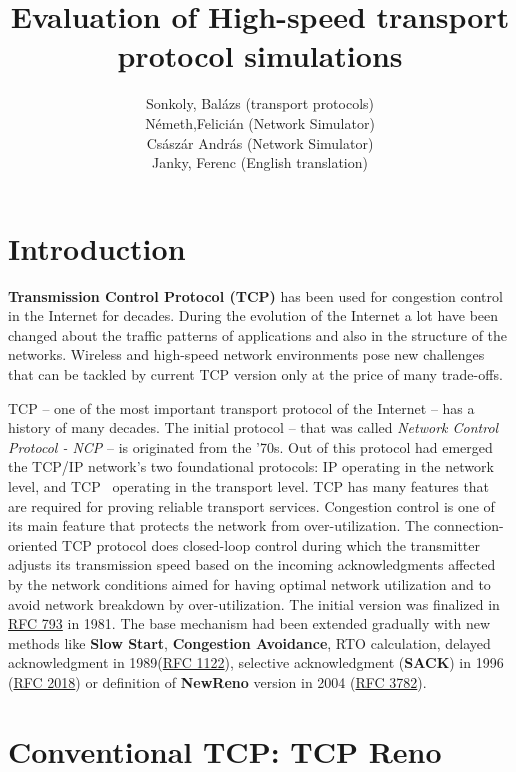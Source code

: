 \documentclass[a4paper]{article}
\title{Evaluation of High-speed transport protocol simulations}
\author{Sonkoly, Balázs (transport protocols) \\ Németh,Felicián (Network Simulator) \\Császár András (Network Simulator) \\ Janky, Ferenc (English translation)
}
\date{}
\begin{document}
\maketitle

\tableofcontents

\section{Introduction}

\textbf{Transmission Control Protocol (TCP)} has been used for congestion control in the Internet for decades. During
the evolution of the Internet a lot have been changed about the traffic patterns of applications and also in the
structure of the networks. Wireless and high-speed network environments pose new challenges that can be tackled by
current TCP version only at the price of many trade-offs.

TCP -- one of the most important transport protocol of the Internet -- has a history of many decades. The initial
protocol -- that was called \emph{Network Control Protocol - NCP} -- is originated from the '70s. Out of this protocol
had emerged the TCP/IP network's two foundational protocols: IP operating in the network level, and
TCP~\cite{CongestionAvoidance} operating in the transport level. TCP has many features that are required for proving
reliable transport services. Congestion control is one of its main feature that protects the network from
over-utilization. The connection-oriented TCP protocol does closed-loop control during which the transmitter adjusts
its transmission speed based on the incoming acknowledgments affected by the network conditions aimed for having
optimal network utilization and to avoid network breakdown by over-utilization. The initial version was finalized in
\href{http://www.faqs.org/rfcs/rfc793.html}{RFC 793} in 1981. The base mechanism had been extended gradually with new
methods like \textbf{Slow Start}, \textbf{Congestion Avoidance}, RTO calculation, delayed acknowledgment in
1989(\href{http://www.faqs.org/rfcs/rfc1122.html}{RFC 1122}), selective acknowledgment (\textbf{SACK}) in 1996
(\href{http://www.faqs.org/rfcs/rfc2018.html}{RFC 2018}) or definition of \textbf{NewReno} version in 2004
(\href{http://www.faqs.org/rfcs/rfc3782.html}{RFC 3782}).

\section{Conventional TCP: TCP Reno}
\end{document}
